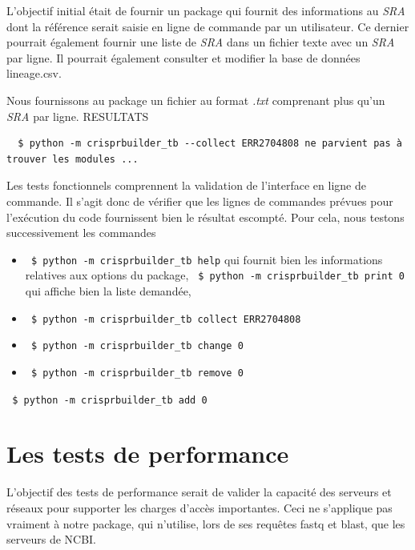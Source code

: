 \documentclass[twoside,a4paper,11pt,frenchb,openany]{report}
\begin{document}
L'objectif initial était de fournir un package qui fournit des informations au \textit{SRA} dont la référence serait saisie en ligne de commande par un utilisateur. Ce dernier pourrait également fournir une liste de \textit{SRA} dans un fichier texte avec un \textit{SRA} par ligne. Il pourrait également consulter et modifier la base de données lineage.csv.

Nous fournissons au package un fichier au format \textit{.txt} comprenant plus qu'un \textit{SRA} par ligne. RESULTATS  

\begin{verbatim}
  $ python -m crisprbuilder_tb --collect ERR2704808 ne parvient pas à trouver les modules ...
\end{verbatim}

Les tests fonctionnels comprennent la validation de l'interface en ligne de commande. Il s'agit donc de vérifier que les lignes de commandes prévues pour l'exécution du code fournissent bien le résultat escompté. Pour cela, nous testons successivement les commandes

\begin{itemize}
\item \texttt{  \$ python -m crisprbuilder\_tb \textemdash \textemdash help} qui fournit bien les informations relatives aux options du package,
\texttt{  \$ python -m crisprbuilder\_tb \textemdash \textemdash print 0} qui affiche bien la liste demandée,
\item \texttt{  \$ python -m crisprbuilder\_tb \textemdash \textemdash collect ERR2704808}
\item \texttt{  \$ python -m crisprbuilder\_tb \textemdash \textemdash change 0}
\item \texttt{  \$ python -m crisprbuilder\_tb \textemdash \textemdash remove 0}
\end{itemize}
\texttt{  \$ python -m crisprbuilder\_tb \textemdash \textemdash add 0}











\section{Les tests de performance}


L'objectif des tests de performance serait de valider la capacité des serveurs et réseaux pour supporter les charges d'accès importantes. Ceci ne s'applique pas vraiment à notre package, qui n'utilise, lors de ses requêtes fastq et blast, que les serveurs de NCBI.
\end{document}
